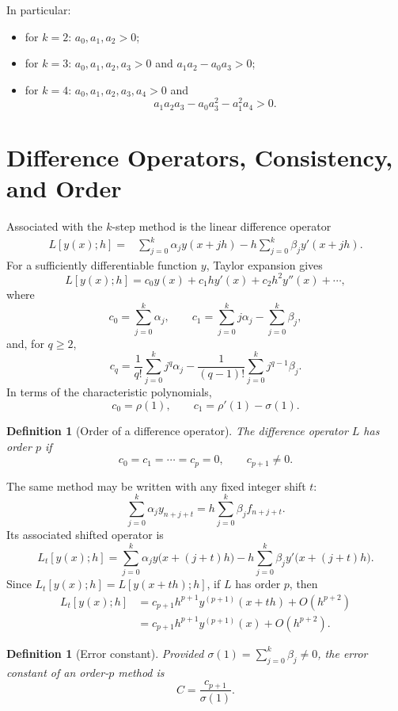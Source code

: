 \documentclass[11pt,a4paper]{article}
\numberwithin{equation}{section}
\theoremstyle{spacedplain}
\theoremstyle{spaceddefinition}
\newtheorem{definition}[theorem]{Definition}
\theoremstyle{spacedremark}
\begin{document}
In particular:
\begin{itemize}
  \item for \(k=2\): \(a_0,a_1,a_2>0\);
  \item for \(k=3\): \(a_0,a_1,a_2,a_3>0\) and
    \(a_1a_2-a_0a_3>0\);
  \item for \(k=4\): \(a_0,a_1,a_2,a_3,a_4>0\) and
    \[
      a_1a_2a_3-a_0a_3^2-a_1^2a_4>0.
    \]
\end{itemize}

\section{Difference Operators, Consistency, and Order}

Associated with the \(k\)-step method is the linear difference operator
\[
\begin{split}
  L[y(x);h]
  ={}&\sum_{j=0}^{k}\alpha_jy(x+jh)
  -h\sum_{j=0}^{k}\beta_jy'(x+jh).
\end{split}
\]
For a sufficiently differentiable function \(y\), Taylor expansion
gives
\[
  L[y(x);h]
  =c_0y(x)+c_1hy'(x)+c_2h^2y''(x)+\cdots,
\]
where
\[
  c_0=\sum_{j=0}^{k}\alpha_j,
  \qquad
  c_1=\sum_{j=0}^{k}j\alpha_j-\sum_{j=0}^{k}\beta_j,
\]
and, for \(q\geq2\),
\[
  c_q
  =\frac{1}{q!}\sum_{j=0}^{k}j^q\alpha_j
   -\frac{1}{(q-1)!}\sum_{j=0}^{k}j^{q-1}\beta_j.
\]
In terms of the characteristic polynomials,
\[
  c_0=\rho(1),
  \qquad
  c_1=\rho'(1)-\sigma(1).
\]

\begin{definition}[Order of a difference operator]
The difference operator \(L\) has order \(p\) if
\[
  c_0=c_1=\cdots=c_p=0,
  \qquad c_{p+1}\neq0.
\]
\end{definition}

The same method may be written with any fixed integer shift \(t\):
\[
  \sum_{j=0}^{k}\alpha_jy_{n+j+t}
  =h\sum_{j=0}^{k}\beta_jf_{n+j+t}.
\]
Its associated shifted operator is
\[
  L_t[y(x);h]
  =\sum_{j=0}^{k}\alpha_jy\bigl(x+(j+t)h\bigr)
  -h\sum_{j=0}^{k}\beta_jy'\bigl(x+(j+t)h\bigr).
\]
Since \(L_t[y(x);h]=L[y(x+th);h]\), if \(L\) has order \(p\), then
\[
\begin{split}
  L_t[y(x);h]
  &=c_{p+1}h^{p+1}y^{(p+1)}(x+th)+O(h^{p+2})\\
  &=c_{p+1}h^{p+1}y^{(p+1)}(x)+O(h^{p+2}).
\end{split}
\]

\begin{definition}[Error constant]
Provided \(\sigma(1)=\sum_{j=0}^{k}\beta_j\neq0\), the error constant of
an order-\(p\) method is
\[
  C=\frac{c_{p+1}}{\sigma(1)}.
\]
\end{definition}
\end{document}
